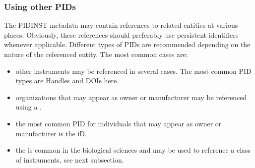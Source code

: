 \documentclass[a4paper,10pt,english]{sphinxmanual}
\begin{document}
\subsubsection{Using other PIDs}
\label{\detokenize{white-paper/metadata-schema-recommendations:using-other-pids}}
The PIDINST metadata may contain references to related entities at
various places.  Obviously, these references should preferably use
persistent identifiers whenever applicable.  Different types of PIDs
are recommended depending on the nature of the referenced entity.  The
most common cases are:
\begin{itemize}
\item {} 
other instruments may be referenced in several cases.  The most
common PID types are Handles and DOIs here.

\item {} 
organizations that may appear as owner or manufacturer may be
referenced using a .

\item {} 
the most common PID for individuals that may appear as owner or
manufacturer is the  iD.

\item {} 
the  is common in the biological sciences and may be used to
reference a class of instruments, see next subsection.

\end{itemize}
\end{document}
